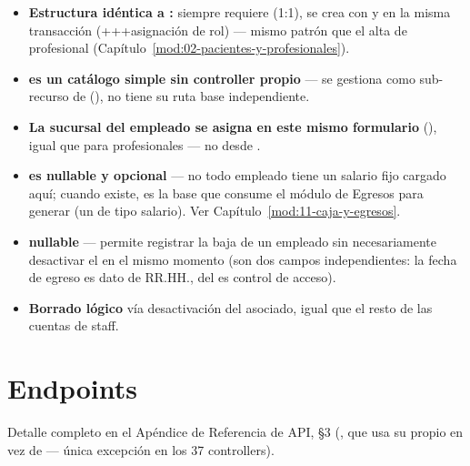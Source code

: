 \begin{itemize}
  \item \textbf{Estructura idéntica a :}  siempre requiere  (1:1), se crea con \allowbreak {}\allowbreak {} y \allowbreak {}\allowbreak {} en la misma transacción (+++asignación de rol) --- mismo patrón que el alta de profesional (Capítulo~\ref{mod:02-pacientes-y-profesionales}).
  \item \textbf{ es un catálogo simple sin controller propio} --- se gestiona como sub-recurso de \allowbreak {} (\code{/}\allowbreak {}\allowbreak {}\allowbreak {}), no tiene su ruta base independiente.
  \item \textbf{La sucursal del empleado se asigna en este mismo formulario} (), igual que para profesionales --- no desde .
  \item \textbf{ es nullable y opcional} --- no todo empleado tiene un salario fijo cargado aquí; cuando existe, es la base que consume el módulo de Egresos para generar  (un  de tipo salario). Ver Capítulo~\ref{mod:11-caja-y-egresos}.
  \item \textbf{ nullable} --- permite registrar la baja de un empleado sin necesariamente desactivar el  en el mismo momento (son dos campos independientes: la fecha de egreso es dato de RR.HH.,  del  es control de acceso).
  \item \textbf{Borrado lógico} vía desactivación del  asociado, igual que el resto de las cuentas de staff.
\end{itemize}

\section{Endpoints}
\label{sec:personal-endpoints}

Detalle completo en el Apéndice de Referencia de API, \S 3 (\allowbreak {}, que usa su propio  en vez de  --- única excepción en los 37 controllers).

